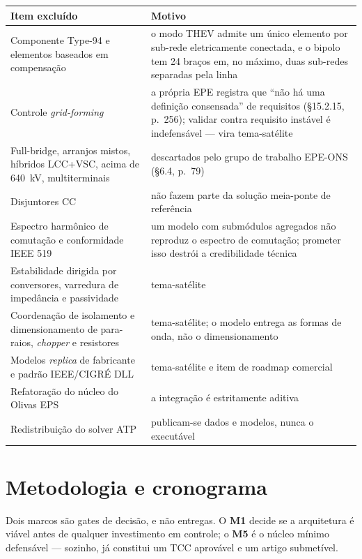 \documentclass[12pt,a4paper]{article}
\begin{document}
\begin{center}
\small
\begin{tabularx}{\textwidth}{@{}p{5.1cm}X@{}}
\toprule
\textbf{Item excluído} & \textbf{Motivo} \\
\midrule
Componente Type-94 e elementos baseados em compensação &
o modo THEV admite um único elemento por sub-rede eletricamente conectada, e o bipolo tem 24 braços
em, no máximo, duas sub-redes separadas pela linha \\
Controle \emph{grid-forming} &
a própria EPE registra que \enquote{não há uma definição consensada} de requisitos (\S15.2.15,
p.~256); validar contra requisito instável é indefensável --- vira tema-satélite \\
Full-bridge, arranjos mistos, híbridos LCC+VSC, acima de 640~kV, multiterminais &
descartados pelo grupo de trabalho EPE-ONS (\S6.4, p.~79) \\
Disjuntores CC &
não fazem parte da solução meia-ponte de referência \\
Espectro harmônico de comutação e conformidade IEEE 519 &
um modelo com submódulos agregados não reproduz o espectro de comutação; prometer isso destrói a
credibilidade técnica \\
Estabilidade dirigida por conversores, varredura de impedância e passividade &
tema-satélite \\
Coordenação de isolamento e dimensionamento de para-raios, \emph{chopper} e resistores &
tema-satélite; o modelo entrega as formas de onda, não o dimensionamento \\
Modelos \emph{replica} de fabricante e padrão IEEE/CIGRÉ DLL &
tema-satélite e item de roadmap comercial \\
Refatoração do núcleo do Olivas EPS &
a integração é estritamente aditiva \\
Redistribuição do solver ATP &
publicam-se dados e modelos, nunca o executável \\
\bottomrule
\end{tabularx}
\end{center}

\section{Metodologia e cronograma}

Dois marcos são gates de decisão, e não entregas. O \textbf{M1} decide se a arquitetura é viável
antes de qualquer investimento em controle; o \textbf{M5} é o núcleo mínimo defensável --- sozinho,
já constitui um TCC aprovável e um artigo submetível.
\end{document}
